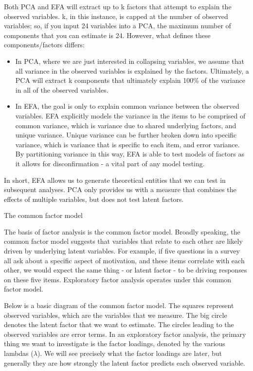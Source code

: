\documentclass[
]{book}
\providecommand{\tightlist}{%
  \setlength{\itemsep}{0pt}\setlength{\parskip}{0pt}}
\begin{document}
Both PCA and EFA will extract up to k factors that attempt to explain the observed variables. k, in this instance, is capped at the number of observed variables; so, if you input 24 variables into a PCA, the maximum number of components that you can estimate is 24. However, what defines these components/factors differs:

\begin{itemize}
\tightlist
\item
  In PCA, where we are just interested in collapsing variables, we assume that all variance in the observed variables is explained by the factors. Ultimately, a PCA will extract k components that ultimately explain 100\% of the variance in all of the observed variables.
\item
  In EFA, the goal is only to explain common variance between the observed variables. EFA explicitly models the variance in the items to be comprised of common variance, which is variance due to shared underlying factors, and unique variance. Unique variance can be further broken down into specific variance, which is variance that is specific to each item, and error variance. By partitioning variance in this way, EFA is able to test models of factors as it allows for disconfirmation - a vital part of any model testing.
\end{itemize}

In short, EFA allows us to generate theoretical entities that we can test in subsequent analyses. PCA only provides us with a measure that combines the effects of multiple variables, but does not test latent factors.

The common factor model

The basis of factor analysis is the common factor model. Broadly speaking, the common factor model suggests that variables that relate to each other are likely driven by underlying latent variables. For example, if five questions in a survey all ask about a specific aspect of motivation, and these items correlate with each other, we would expect the same thing - or latent factor - to be driving responses on these five items. Exploratory factor analysis operates under this common factor model.

Below is a basic diagram of the common factor model. The squares represent observed variables, which are the variables that we measure. The big circle denotes the latent factor that we want to estimate. The circles leading to the observed variables are error terms. In an exploratory factor analysis, the primary thing we want to investigate is the factor loadings, denoted by the various lambdas (\(\lambda\)). We will see precisely what the factor loadings are later, but generally they are how strongly the latent factor predicts each observed variable.
\end{document}
